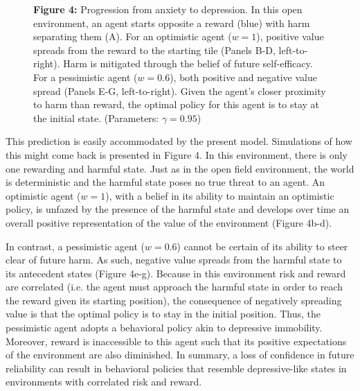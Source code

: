 \documentclass[11pt]{article} %
\begin{document}
\begin{figure}
  \centerline{%
  }
  \par \textbf{Figure 4:} Progression from anxiety to depression. In this open environment, an agent starts opposite a reward (blue) with harm separating them (A). For an optimistic agent ($w=1$), positive value spreads from the reward to the starting tile (Panels B-D, left-to-right). Harm is mitigated through the belief of future self-efficacy. For a pessimistic agent ($w=0.6$), both positive and negative value spread (Panels E-G, left-to-right). Given the agent's closer proximity to harm than reward, the optimal policy for this agent is to stay at the initial state. (Parameters: $\gamma = 0.95$)
\end{figure}

This prediction is easily accommodated by the present model. Simulations of how this might come back is presented in Figure 4. In this environment, there is only one rewarding and harmful state. Just as in the open field environment, the world is deterministic and the harmful state poses no true threat to an agent. An optimistic agent ($w=1$), with a belief in its ability to maintain an optimistic policy, is unfazed by the presence of the harmful state and develops over time an overall positive representation of the value of the environment (Figure 4b-d).

In contrast, a pessimistic agent ($w=0.6$) cannot be certain of its ability to steer clear of future harm. As such, negative value spreads from the harmful state to its antecedent states (Figure 4e-g). Because in this environment risk and reward are correlated (i.e. the agent must approach the harmful state in order to reach the reward given its starting position), the consequence of negatively spreading value is that the optimal policy is to stay in the initial position. Thus, the pessimistic agent adopts a behavioral policy akin to depressive immobility. Moreover, reward is inaccessible to this agent such that its positive expectations of the environment are also diminished. In summary, a loss of confidence in future reliability can result in behavioral policies that resemble depressive-like states in environments with correlated risk and reward.
\end{document}
